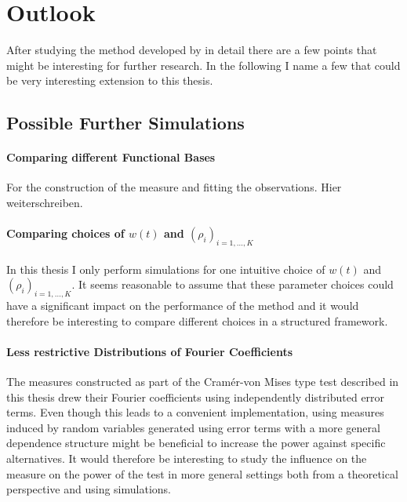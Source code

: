 \documentclass[12pt, a4paper]{article}
\theoremstyle{MAstyle} \newtheorem{assumption}{Assumption}[section]
\theoremstyle{MAstyle} \newtheorem{definition}{Definition}[section]
\theoremstyle{MAstyle} \newtheorem{theorem}{Theorem}[section]
\begin{document}
	\section{Outlook}\label{Outlook}
		After studying the method developed by \cite{bugni_permutation_2021} in detail there are a few points that might be interesting for further research. In the following I name a few that could be very interesting extension to this thesis.
		
		\subsection{Possible Further Simulations}
			\paragraph{Comparing different Functional Bases\\} 
			For the construction of the measure and fitting the observations. 
			{\color{red} Hier weiterschreiben.}
		
			\paragraph{Comparing choices of $w(t)$ and  $\left(\rho_i\right)_{i = 1, \dots, K}$\\}
			In this thesis I only perform simulations for one intuitive choice of $w(t)$ and $\left(\rho_i\right)_{i = 1, \dots, K}$. It seems reasonable to assume that these parameter choices could have a significant impact on the performance of the method and it would therefore be interesting to compare different choices in a structured framework.
			
			\paragraph{Less restrictive Distributions of Fourier Coefficients\\}
			The measures constructed as part of the Cram\'{e}r-von Mises type test described in this thesis drew their Fourier coefficients using independently distributed error terms. Even though this leads to a convenient implementation, using measures induced by random variables generated using error terms with a more general dependence structure might be beneficial to increase the power against specific alternatives. It would therefore be interesting to study the influence on the measure on the power of the test in more general settings both from a theoretical perspective and using simulations. 
		
\end{document}
